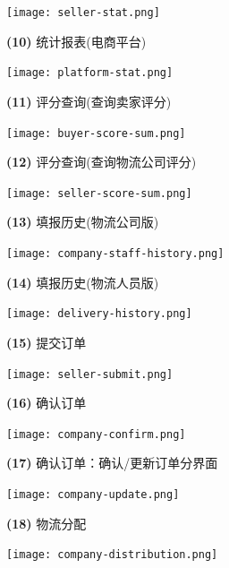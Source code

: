 \documentclass[12pt]{article}
\begin{document}
\begin{center}
	\texttt{[image: seller-stat.png]}
\end{center}

\newpage
\noindent \textbf{(10)} 统计报表(电商平台)

\begin{center}
	\texttt{[image: platform-stat.png]}
\end{center}

\newpage
\noindent \textbf{(11)} 评分查询(查询卖家评分)

\begin{center}
	\texttt{[image: buyer-score-sum.png]}
\end{center}

\noindent \textbf{(12)} 评分查询(查询物流公司评分)

\begin{center}
	\texttt{[image: seller-score-sum.png]}
\end{center}

\noindent \textbf{(13)} 填报历史(物流公司版)

\begin{center}
	\texttt{[image: company-staff-history.png]}
\end{center}

\noindent \textbf{(14)} 填报历史(物流人员版)

\begin{center}
	\texttt{[image: delivery-history.png]}
\end{center}

\noindent \textbf{(15)} 提交订单

\begin{center}
	\texttt{[image: seller-submit.png]}
\end{center}

\noindent \textbf{(16)} 确认订单

\begin{center}
	\texttt{[image: company-confirm.png]}
\end{center}

\noindent \textbf{(17)} 确认订单：确认/更新订单分界面

\begin{center}
	\texttt{[image: company-update.png]}
\end{center}

\noindent \textbf{(18)} 物流分配

\begin{center}
	\texttt{[image: company-distribution.png]}
\end{center}
\end{document}
